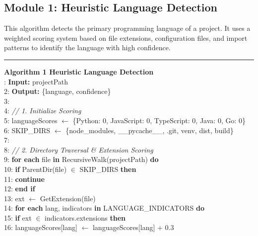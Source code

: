 \subsection{Module 1: Heuristic Language Detection}

This algorithm detects the primary programming language of a project. It uses a weighted scoring system based on file extensions, configuration files, and import patterns to identify the language with high confidence.

\noindent\rule{\textwidth}{0.4pt}
\textbf{Algorithm 1 Heuristic Language Detection}\\
: \textbf{Input:} projectPath\\
2: \textbf{Output:} \{language, confidence\}\\
3:\\
4: \textit{// 1. Initialize Scoring}\\
5: languageScores $\leftarrow$ \{Python: 0, JavaScript: 0, TypeScript: 0, Java: 0, Go: 0\}\\
6: SKIP\_DIRS $\leftarrow$ \{node\_modules, \_\_pycache\_\_, .git, venv, dist, build\}\\
7:\\
8: \textit{// 2. Directory Traversal \& Extension Scoring}\\
9: \textbf{for each} file \textbf{in} RecursiveWalk(projectPath) \textbf{do}\\
10: \hspace{0.5cm}\textbf{if} ParentDir(file) $\in$ SKIP\_DIRS \textbf{then}\\
11: \hspace{1cm}\textbf{continue}\\
12: \hspace{0.5cm}\textbf{end if}\\
13: \hspace{0.5cm}ext $\leftarrow$ GetExtension(file)\\
14: \hspace{0.5cm}\textbf{for each} lang, indicators \textbf{in} LANGUAGE\_INDICATORS \textbf{do}\\
15: \hspace{1cm}\textbf{if} ext $\in$ indicators.extensions \textbf{then}\\
16: \hspace{1.5cm}languageScores[lang] $\leftarrow$ languageScores[lang] + 0.3\\
